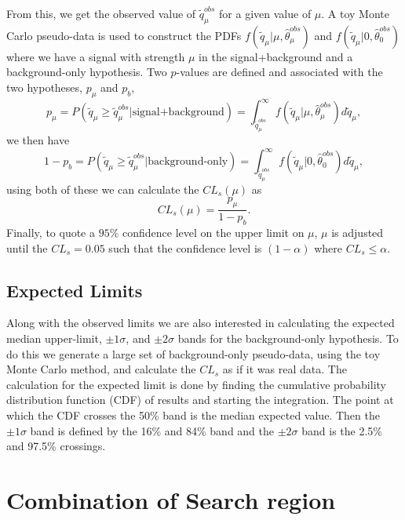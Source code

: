 From this, we get the observed value of $\widetilde{q}_\mu^{obs}$ for a given value of $\mu$. A toy Monte Carlo pseudo-data is used to construct the PDFs $f(\widetilde{q}_\mu|\mu,\hat{\theta}_\mu^{obs})$ and $f(\widetilde{q}_\mu|0,\hat{\theta}_0^{obs})$ where we have a signal with strength $\mu$ in the signal+background and a background-only hypothesis. Two $p$-values are defined and associated with the two hypotheses, $p_\mu$ and $p_b$,
\begin{equation}\label{eqn:splusb}
p_\mu=P(\widetilde{q}_\mu\geq\widetilde{q}_\mu^{obs}|\text{signal+background})=\int_{\widetilde{q}_\mu^{obs}}^{\infty}f(\widetilde{q}_\mu|\mu,\hat{\theta}_\mu^{obs})d\widetilde{q}_\mu,
\end{equation} \label{eqn:b}
we then have
\begin{equation}
1-p_b=P(\widetilde{q}_\mu\geq\widetilde{q}_\mu^{obs}|\text{background-only})=\int_{\widetilde{q}_\mu^{obs}}^{\infty}f(\widetilde{q}_\mu|0,\hat{\theta}_0^{obs})d\widetilde{q}_\mu,
\end{equation}
using both of these we can calculate the $CL_s(\mu)$ as 
\begin{equation}
CL_s(\mu)=\frac{p_\mu}{1-p_b}.
\end{equation}
Finally, to quote a $95\%$ confidence level on the upper limit on $\mu$, $\mu$ is adjusted until the $CL_s=0.05$ such that the confidence level is $(1-\alpha)$ where $CL_s\leq\alpha$. 

\subsection{Expected Limits}\label{sec:ExpLimits}

Along with the observed limits we are also interested in calculating the expected median upper-limit, $\pm1\sigma$, and $\pm2\sigma$ bands for the background-only hypothesis. To do this we generate a large set of background-only pseudo-data, using the toy Monte Carlo method, and calculate the $CL_s$ as if it was real data. The calculation for the expected limit is done by finding the cumulative probability distribution function (CDF) of results and starting the integration. The point at which the CDF crosses the 50\% band is the median expected value. Then the $\pm1\sigma$ band is defined by the 16\% and 84\% band and the $\pm2\sigma$ band is the 2.5\% and 97.5\% crossings. 

\section{Combination of Search region}\label{sec:Combination}

